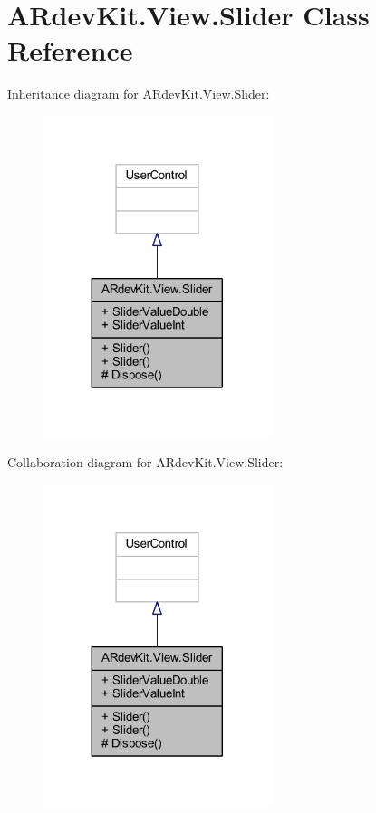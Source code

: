 \hypertarget{class_a_rdev_kit_1_1_view_1_1_slider}{\section{A\-Rdev\-Kit.\-View.\-Slider Class Reference}
\label{class_a_rdev_kit_1_1_view_1_1_slider}
}


Inheritance diagram for A\-Rdev\-Kit.\-View.\-Slider\-:
\nopagebreak
\begin{figure}[H]
\begin{center}
\leavevmode
\includegraphics[width=188pt]{class_a_rdev_kit_1_1_view_1_1_slider__inherit__graph}
\end{center}
\end{figure}


Collaboration diagram for A\-Rdev\-Kit.\-View.\-Slider\-:
\nopagebreak
\begin{figure}[H]
\begin{center}
\leavevmode
\includegraphics[width=188pt]{class_a_rdev_kit_1_1_view_1_1_slider__coll__graph}
\end{center}
\end{figure}
